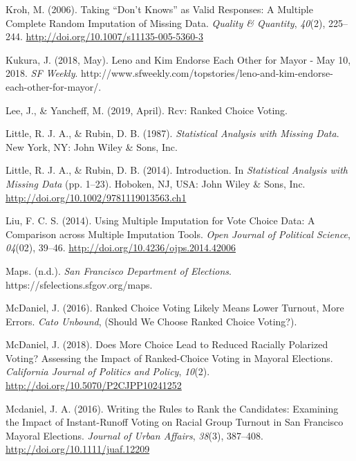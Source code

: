 \documentclass[12pt,twoside]{reedthesis}
\begin{document}
\leavevmode\hypertarget{ref-kroh_taking_2006}{}%
Kroh, M. (2006). Taking ``Don't Knows'' as Valid Responses: A Multiple Complete Random Imputation of Missing Data. \emph{Quality \& Quantity}, \emph{40}(2), 225--244. \url{http://doi.org/10.1007/s11135-005-5360-3}

\leavevmode\hypertarget{ref-kukura_leno_2018}{}%
Kukura, J. (2018, May). Leno and Kim Endorse Each Other for Mayor - May 10, 2018. \emph{SF Weekly}. http://www.sfweekly.com/topstories/leno-and-kim-endorse-each-other-for-mayor/.

\leavevmode\hypertarget{ref-lee_rcv_2019}{}%
Lee, J., \& Yancheff, M. (2019, April). Rcv: Ranked Choice Voting.

\leavevmode\hypertarget{ref-little_statistical_1987}{}%
Little, R. J. A., \& Rubin, D. B. (1987). \emph{Statistical Analysis with Missing Data}. New York, NY: John Wiley \& Sons, Inc.

\leavevmode\hypertarget{ref-little_introduction_2014}{}%
Little, R. J. A., \& Rubin, D. B. (2014). Introduction. In \emph{Statistical Analysis with Missing Data} (pp. 1--23). Hoboken, NJ, USA: John Wiley \& Sons, Inc. \url{http://doi.org/10.1002/9781119013563.ch1}

\leavevmode\hypertarget{ref-liu_using_2014}{}%
Liu, F. C. S. (2014). Using Multiple Imputation for Vote Choice Data: A Comparison across Multiple Imputation Tools. \emph{Open Journal of Political Science}, \emph{04}(02), 39--46. \url{http://doi.org/10.4236/ojps.2014.42006}

\leavevmode\hypertarget{ref-noauthor_maps_nodate}{}%
Maps. (n.d.). \emph{San Francisco Department of Elections}. https://sfelections.sfgov.org/maps.

\leavevmode\hypertarget{ref-mcdaniel_ranked_2016}{}%
McDaniel, J. (2016). Ranked Choice Voting Likely Means Lower Turnout, More Errors. \emph{Cato Unbound}, (Should We Choose Ranked Choice Voting?).

\leavevmode\hypertarget{ref-mcdaniel_does_2018}{}%
McDaniel, J. (2018). Does More Choice Lead to Reduced Racially Polarized Voting? Assessing the Impact of Ranked-Choice Voting in Mayoral Elections. \emph{California Journal of Politics and Policy}, \emph{10}(2). \url{http://doi.org/10.5070/P2CJPP10241252}

\leavevmode\hypertarget{ref-mcdaniel_writing_2016}{}%
Mcdaniel, J. A. (2016). Writing the Rules to Rank the Candidates: Examining the Impact of Instant-Runoff Voting on Racial Group Turnout in San Francisco Mayoral Elections. \emph{Journal of Urban Affairs}, \emph{38}(3), 387--408. \url{http://doi.org/10.1111/juaf.12209}
\end{document}
